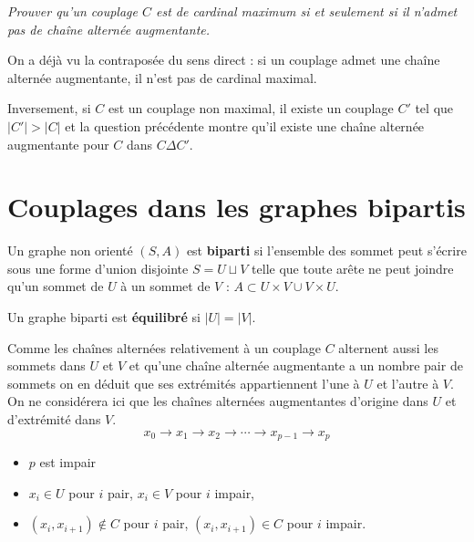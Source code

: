 \begin{Exercise}[title=Théorème de Berge]\it
Prouver qu'un couplage $C$ est de cardinal maximum si et seulement si il n'admet pas de chaîne alternée augmentante.
\end{Exercise}
\begin{Answer}On a déjà vu la contraposée du sens direct : si un couplage admet une chaîne alternée augmentante, il n'est pas de cardinal maximal.

Inversement, si $C$ est un couplage non maximal, il existe un couplage $C'$ tel que $|C'| > |C|$ et la question précédente montre qu'il existe une chaîne alternée augmentante pour $C$ dans $C \Delta C'$.
\end{Answer}
\section{Couplages dans les graphes bipartis}
Un graphe non orienté $(S,A)$ est {\bf biparti} si l'ensemble des sommet peut s'écrire sous une forme d'union disjointe $S = U \sqcup V$ telle que toute arête ne peut joindre qu'un sommet de $U$ à un sommet de $V$ : $A \subset U \times V \cup V\times U$.

\medskip

Un graphe biparti est {\bf équilibré} si  $|U|=|V|$.

\newpage

Comme les chaînes alternées relativement à un couplage $C$ alternent aussi les sommets dans $U$ et $V$ et qu'une chaîne alternée augmentante a un nombre pair de sommets on en déduit que ses extrémités appartiennent l'une à $U$ et l'autre à $V$. On ne considérera ici que les chaînes alternées augmentantes d'origine dans $U$ et d'extrémité dans $V$.
\[x_0 \rightarrow x_1 \rightarrow x_2\rightarrow \cdots \rightarrow x_{p-1} \rightarrow x_p\]
\begin{itemize}
    \item $p$ est impair
    \item $x_i\in U$ pour $i$ pair, $x_i\in V$ pour $i$ impair, 
    \item $(x_i, x_{i+1})\notin C$ pour $i$ pair, $(x_i, x_{i+1})\in C$ pour $i$ impair. 
\end{itemize}
